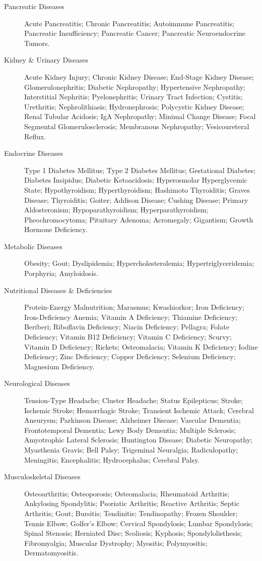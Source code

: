 \begin{description}
%
\item[Pancreatic Diseases] Acute Pancreatitis; Chronic Pancreatitis; Autoimmune Pancreatitis; Pancreatic Insufficiency; Pancreatic Cancer; Pancreatic Neuroendocrine Tumors.
%
\item[Kidney \& Urinary Diseases] Acute Kidney Injury; Chronic Kidney Disease; End-Stage Kidney Disease; Glomerulonephritis; Diabetic Nephropathy; Hypertensive Nephropathy; Interstitial Nephritis; Pyelonephritis; Urinary Tract Infection; Cystitis; Urethritis; Nephrolithiasis; Hydronephrosis; Polycystic Kidney Disease; Renal Tubular Acidosis; IgA Nephropathy; Minimal Change Disease; Focal Segmental Glomerulosclerosis; Membranous Nephropathy; Vesicoureteral Reflux.
%
\item[Endocrine Diseases] Type 1 Diabetes Mellitus; Type 2 Diabetes Mellitus; Gestational Diabetes; Diabetes Insipidus; Diabetic Ketoacidosis; Hyperosmolar Hyperglycemic State; Hypothyroidism; Hyperthyroidism; Hashimoto Thyroiditis; Graves Disease; Thyroiditis; Goiter; Addison Disease; Cushing Disease; Primary Aldosteronism; Hypoparathyroidism; Hyperparathyroidism; Pheochromocytoma; Pituitary Adenoma; Acromegaly; Gigantism; Growth Hormone Deficiency.
%
\item[Metabolic Diseases] Obesity; Gout; Dyslipidemia; Hypercholesterolemia; Hypertriglyceridemia; Porphyria; Amyloidosis.
%
\item[Nutritional Diseases \& Deficiencies] Protein-Energy Malnutrition; Marasmus; Kwashiorkor; Iron Deficiency; Iron-Deficiency Anemia; Vitamin A Deficiency; Thiamine Deficiency; Beriberi; Riboflavin Deficiency; Niacin Deficiency; Pellagra; Folate Deficiency; Vitamin B12 Deficiency; Vitamin C Deficiency; Scurvy; Vitamin D Deficiency; Rickets; Osteomalacia; Vitamin K Deficiency; Iodine Deficiency; Zinc Deficiency; Copper Deficiency; Selenium Deficiency; Magnesium Deficiency.
%
\item[Neurological Diseases] Tension-Type Headache; Cluster Headache; Status Epilepticus; Stroke; Ischemic Stroke; Hemorrhagic Stroke; Transient Ischemic Attack; Cerebral Aneurysm; Parkinson Disease; Alzheimer Disease; Vascular Dementia; Frontotemporal Dementia; Lewy Body Dementia; Multiple Sclerosis; Amyotrophic Lateral Sclerosis; Huntington Disease; Diabetic Neuropathy; Myasthenia Gravis; Bell Palsy; Trigeminal Neuralgia; Radiculopathy; Meningitis; Encephalitis; Hydrocephalus; Cerebral Palsy.
%
\item[Musculoskeletal Diseases] Osteoarthritis; Osteoporosis; Osteomalacia; Rheumatoid Arthritis; Ankylosing Spondylitis; Psoriatic Arthritis; Reactive Arthritis; Septic Arthritis; Gout; Bursitis; Tendinitis; Tendinopathy; Frozen Shoulder; Tennis Elbow; Golfer's Elbow; Cervical Spondylosis; Lumbar Spondylosis; Spinal Stenosis; Herniated Disc; Scoliosis; Kyphosis; Spondylolisthesis; Fibromyalgia; Muscular Dystrophy; Myositis; Polymyositis; Dermatomyositis.

\end{description}
